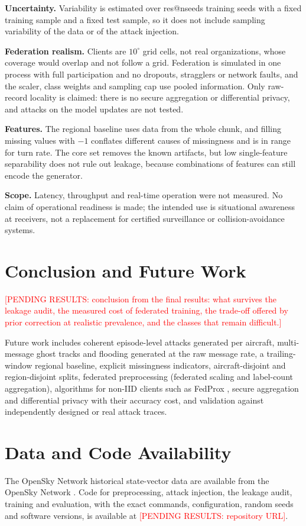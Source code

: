 \documentclass[conference]{IEEEtran}
\makeatletter
\providecommand{\R}[1]{\csname res@#1\endcsname}
\newcommand{\pending}[1]{\textcolor{red}{[PENDING RESULTS: #1]}}
\makeatother
\begin{document}
\textbf{Uncertainty.} Variability is estimated over \R{nseeds} training seeds with a fixed training sample and a fixed test sample, so it does not include sampling variability of the data or of the attack injection.

\textbf{Federation realism.} Clients are $10^\circ$ grid cells, not real organizations, whose coverage would overlap and not follow a grid. Federation is simulated in one process with full participation and no dropouts, stragglers or network faults, and the scaler, class weights and sampling cap use pooled information. Only raw-record locality is claimed: there is no secure aggregation or differential privacy, and attacks on the model updates are not tested.

\textbf{Features.} The regional baseline uses data from the whole chunk, and filling missing values with $-1$ conflates different causes of missingness and is in range for turn rate. The core set removes the known artifacts, but low single-feature separability does not rule out leakage, because combinations of features can still encode the generator.

\textbf{Scope.} Latency, throughput and real-time operation were not measured. No claim of operational readiness is made; the intended use is situational awareness at receivers, not a replacement for certified surveillance or collision-avoidance systems.

\section{Conclusion and Future Work}

\pending{conclusion from the final results: what survives the leakage audit, the measured cost of federated training, the trade-off offered by prior correction at realistic prevalence, and the classes that remain difficult.}

Future work includes coherent episode-level attacks generated per aircraft, multi-message ghost tracks and flooding generated at the raw message rate, a trailing-window regional baseline, explicit missingness indicators, aircraft-disjoint and region-disjoint splits, federated preprocessing (federated scaling and label-count aggregation), algorithms for non-IID clients such as FedProx \cite{li2020fedprox}, secure aggregation and differential privacy with their accuracy cost, and validation against independently designed or real attack traces.

\section*{Data and Code Availability}
The OpenSky Network historical state-vector data are available from the OpenSky Network \cite{schafer2014}. Code for preprocessing, attack injection, the leakage audit, training and evaluation, with the exact commands, configuration, random seeds and software versions, is available at \pending{repository URL}.



\end{document}
